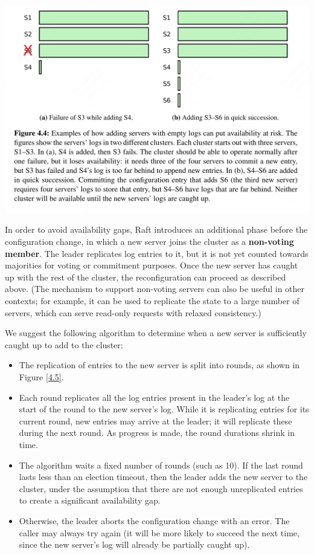 \documentclass[11pt]{article}
\begin{document}
\begin{center}
\includegraphics[width=.99\textwidth]{../../images/papers/18.png}
\label{4.4}
\end{center}

In order to avoid availability gaps, Raft introduces an additional phase before the configuration
change, in which a new server joins the cluster as a \textbf{non-voting member}. The leader replicates log
entries to it, but it is not yet counted towards majorities for voting or commitment purposes. Once
the new server has caught up with the rest of the cluster, the reconfiguration can proceed as
described above. (The mechanism to support non-voting servers can also be useful in other contexts;
for example, it can be used to replicate the state to a large number of servers, which can serve
read-only requests with relaxed consistency.)

We suggest the following algorithm to determine when a new server is sufficiently caught up to add to
the cluster:
\begin{itemize}
\item The replication of entries to the new server is split into rounds, as shown in Figure \ref{4.5}.
\item Each round replicates all the log entries present in the leader’s log at the start of the round to
the new server’s log. While it is replicating entries for its current round, new entries may arrive
at the leader; it will replicate these during the next round. As progress is made, the round
durations shrink in time.
\item The algorithm waits a fixed number of rounds (such as 10). If the last round lasts less than an
election timeout, then the leader adds the new server to the cluster, under the assumption that
there are not enough unreplicated entries to create a significant availability gap.
\item Otherwise, the leader aborts the configuration change with an error. The caller may always try again
(it will be more likely to succeed the next time, since the new server’s log will already be
partially caught up).
\end{itemize}
\end{document}
